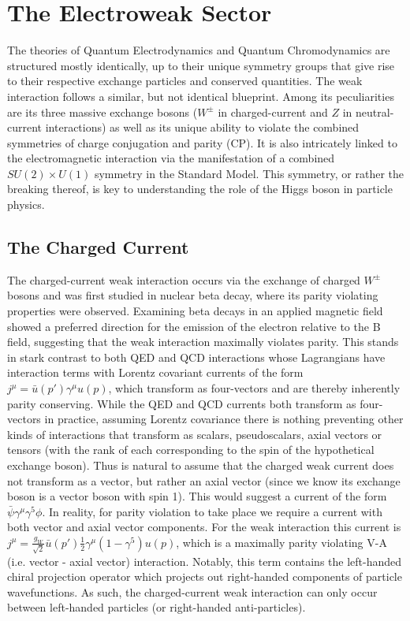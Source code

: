 \section{The Electroweak Sector}

The theories of Quantum Electrodynamics and Quantum Chromodynamics are structured mostly identically, up to their 
unique symmetry groups that give rise to their respective exchange particles and conserved quantities. The weak 
interaction follows a similar, but not identical blueprint. Among its peculiarities are its three massive exchange bosons 
($W^{\pm}$ in charged-current and $Z$ in neutral-current interactions) as well as its unique ability to violate the 
combined symmetries of charge conjugation and parity (CP). It is also intricately linked to the electromagnetic 
interaction via the manifestation of a combined $SU(2) \times U(1)$ symmetry in the Standard Model. This symmetry, 
or rather the breaking thereof, is key to understanding the role of the Higgs boson in particle physics. 

\subsection{The Charged Current}

The charged-current weak interaction occurs via the exchange of charged $W^{\pm}$ bosons and was first 
studied in nuclear beta decay, where its parity violating properties were observed. Examining beta decays in an 
applied magnetic field showed a preferred direction for the emission of the electron relative to the B field, 
suggesting that the weak interaction maximally violates parity. This stands in stark contrast to both QED and QCD 
interactions whose Lagrangians have interaction terms with Lorentz covariant currents of the form
$j^{\mu} = \bar{u}(p')\gamma^{\mu}u(p)$, which transform as four-vectors and are thereby inherently parity 
conserving. While the QED and QCD currents both transform as four-vectors in practice, assuming Lorentz covariance 
there is nothing preventing other kinds of interactions that transform as scalars, pseudoscalars, axial vectors or 
tensors (with the rank of each corresponding to the spin of the hypothetical exchange boson). Thus is natural to 
assume that the charged weak current does not transform as a vector, but rather an axial vector (since we know 
its exchange boson is a vector boson with spin 1). This would suggest a current of the form 
$\bar{\psi}\gamma^{\mu}\gamma^{5}\phi$. In reality, for parity violation to take place we require a current with both 
vector and axial vector components. For the weak interaction this current is
$j^{\mu} = \frac{g_W}{\sqrt{2}}\bar{u}(p')\frac{1}{2}\gamma^{\mu}(1-\gamma^{5})u(p)$, which is a maximally parity 
violating V-A (i.e. vector - axial vector) interaction. Notably, this term contains the left-handed chiral projection 
operator which projects out right-handed components of particle wavefunctions. As such,  the charged-current weak 
interaction can only occur between left-handed particles (or right-handed anti-particles). \par

